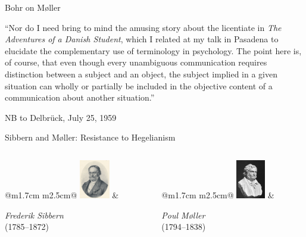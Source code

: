 \documentclass[fleqn]{beamer}
\begin{document}
\begin{frame}{Bohr on Møller}

  ``Nor do I need bring to mind the amusing story about the licentiate
  in \emph{The Adventures of a Danish Student}, which I related at my
  talk in Pasadena to elucidate the complementary use of terminology
  in psychology. The point here is, of course, that even though every
  unambiguous communication requires distinction between a subject and
  an object, the subject implied in a given situation can wholly or
  partially be included in the objective content of a communication
  about another situation.''

  \medskip NB to Delbr{\"u}ck, July 25, 1959

\end{frame}


\begin{frame}{Sibbern and Møller: Resistance to Hegelianism}

\begin{columns}
  \begin{column}{0.45\textwidth}
    \begin{tabular}[t]{@{}m{1.7cm} m{2.5cm}@{}}
      \includegraphics[height=1.7cm]{sibbern.jpg} & 
      \begin{minipage}[t]{\linewidth}
        \vspace{0pt}
        \small \textit{Frederik Sibbern} \\[-0.3em]
        \small (1785–1872)
      \end{minipage}
    \end{tabular}
  \end{column}

  \begin{column}{0.45\textwidth}
    \begin{tabular}[t]{@{}m{1.7cm} m{2.5cm}@{}}
      \includegraphics[height=1.7cm]{moller.jpg} & 
      \begin{minipage}[t]{\linewidth}
        \vspace{0pt}
        \small \textit{Poul Møller} \\[-0.3em]
        \small (1794–1838)
      \end{minipage}
    \end{tabular}
  \end{column}
\end{columns}
  

\end{frame}
\end{document}
